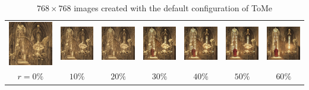 \begin{table}[!htb]
\begin{tabular}{c c@{}c@{}c@{}c@{}c@{}c}
    \includegraphics[width=0.135\linewidth]{chapter/appendix/def_imgs/church/ch_0.png} &
    \includegraphics[width=0.135\linewidth]{chapter/appendix/def_imgs/church/ch_10.png} &
    \includegraphics[width=0.135\linewidth]{chapter/appendix/def_imgs/church/ch_20.png} &
    \includegraphics[width=0.135\linewidth]{chapter/appendix/def_imgs/church/ch_30.png} &
    \includegraphics[width=0.135\linewidth]{chapter/appendix/def_imgs/church/ch_40.png} &
    \includegraphics[width=0.135\linewidth]{chapter/appendix/def_imgs/church/ch_50.png} &
    \includegraphics[width=0.135\linewidth]{chapter/appendix/def_imgs/church/ch_60.png} \\
    \(r=0\%\) & \(10\%\) & \(20\%\) & \(30\%\) & \(40\%\) & \(50\%\) & \(60\%\) \\
\end{tabular}
\caption{$768 \times 768$ images created with the default configuration of ToMe}
\end{table}

